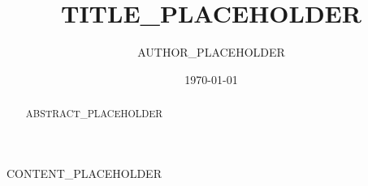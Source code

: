 \documentclass[11pt,a4paper]{article}
\title{TITLE_PLACEHOLDER}
\author{AUTHOR_PLACEHOLDER}
\date{\today}
\begin{document}
\maketitle

\begin{abstract}
ABSTRACT_PLACEHOLDER
\end{abstract}

\tableofcontents
\newpage

CONTENT_PLACEHOLDER



\end{document}
